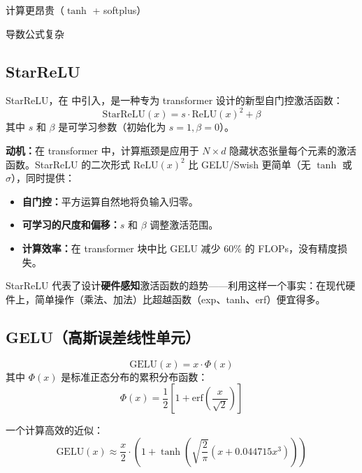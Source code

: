 \begin{disadvantages}
    \item 计算更昂贵（$\tanh$ + softplus）
    \item 导数公式复杂
\end{disadvantages}

\subsection{StarReLU}

StarReLU，在 \cite{maulik2024starrelu} 中引入，是一种专为 transformer 设计的新型自门控激活函数：
\begin{equation}
\text{StarReLU}(x) = s \cdot \text{ReLU}(x)^2 + \beta
\end{equation}
其中 $s$ 和 $\beta$ 是可学习参数（初始化为 $s = 1, \beta = 0$）。

\textbf{动机：}在 transformer 中，计算瓶颈是应用于 $N \times d$ 隐藏状态张量每个元素的激活函数。StarReLU 的二次形式 $\text{ReLU}(x)^2$ 比 GELU/Swish 更简单（无 $\tanh$ 或 $\sigma$），同时提供：
\begin{itemize}
    \item \textbf{自门控：}平方运算自然地将负输入归零。
    \item \textbf{可学习的尺度和偏移：}$s$ 和 $\beta$ 调整激活范围。
    \item \textbf{计算效率：}在 transformer 块中比 GELU 减少 60\% 的 FLOPs，没有精度损失。
\end{itemize}

StarReLU 代表了设计\textbf{硬件感知}激活函数的趋势——利用这样一个事实：在现代硬件上，简单操作（乘法、加法）比超越函数（exp、tanh、erf）便宜得多。

\subsection{GELU（高斯误差线性单元）}

\begin{equation}
\text{GELU}(x) = x \cdot \Phi(x)
\end{equation}
其中 $\Phi(x)$ 是标准正态分布的累积分布函数：
\begin{equation}
\Phi(x) = \frac{1}{2}\left[1 + \text{erf}\left(\frac{x}{\sqrt{2}}\right)\right]
\end{equation}

一个计算高效的近似：
\begin{equation}
\text{GELU}(x) \approx \frac{x}{2} \cdot \left(1 + \tanh\left(\sqrt{\frac{2}{\pi}}\left(x + 0.044715x^3\right)\right)\right)
\end{equation}

